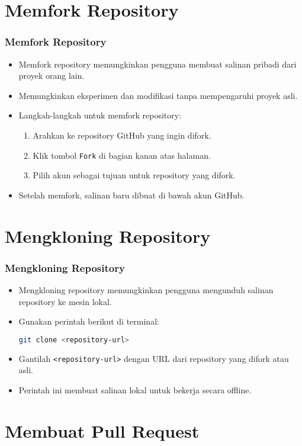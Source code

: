 \documentclass[aspectratio=169, table]{beamer}
\begin{document}
\section{Memfork Repository}

\begin{frame}[fragile]
	\frametitle{Memfork Repository}
	\begin{itemize}
		\item Memfork repository memungkinkan pengguna membuat salinan pribadi dari proyek orang lain.
		\item Memungkinkan eksperimen dan modifikasi tanpa mempengaruhi proyek asli.
		\item Langkah-langkah untuk memfork repository:
		\begin{enumerate}
			\item Arahkan ke repository GitHub yang ingin difork.
			\item Klik tombol \texttt{Fork} di bagian kanan atas halaman.
			\item Pilih akun sebagai tujuan untuk repository yang difork.
		\end{enumerate}
		\item Setelah memfork, salinan baru dibuat di bawah akun GitHub.
	\end{itemize}
\end{frame}

\section{Mengkloning Repository}

\begin{frame}[fragile]
	\frametitle{Mengkloning Repository}
	\begin{itemize}
		\item Mengkloning repository memungkinkan pengguna mengunduh salinan repository ke mesin lokal.
		\item Gunakan perintah berikut di terminal:
		\begin{lstlisting}[language=bash]
			git clone <repository-url>
		\end{lstlisting}
		\item Gantilah \texttt{<repository-url>} dengan URL dari repository yang difork atau asli.
		\item Perintah ini membuat salinan lokal untuk bekerja secara offline.
	\end{itemize}
\end{frame}

\section{Membuat Pull Request}
\end{document}
